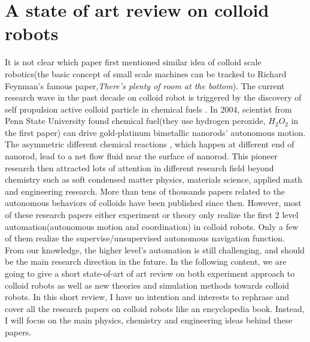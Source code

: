 \section{A state of art review on colloid robots }
It is not clear which paper first mentioned  similar idea of colloid scale robotics(the basic concept of  small scale machines can be tracked to Richard Feynman's famous paper,\textit{There's plenty of room at the bottom}\cite{feynman1960there}). The current research wave in the past decade on colloid robot is triggered by the discovery of self propulsion active colloid particle in chemical fuels \cite{paxton2004catalytic}. In 2004, scientist from Penn State University found chemical fuel(they use hydrogen peroxide, $H_2O_2$ in the first paper) can drive  gold-platinum bimetallic nanorods' autonomous motion. The asymmetric different chemical reactions , which happen at different end of nanorod,  lead to a net flow fluid near the surface of nanorod. This pioneer research then attracted lots of attention in different research field beyond chemistry such as soft condensed matter physics\cite{Marchetti2013}, materials science\cite{han2018engineering}, applied math\cite{fodor2016far} and engineering research\cite{sitti2015biomedical}. More than tens of thousands papers related to the autonomous behaviors of colloids have been published since then. However, most of these research papers either experiment or theory only realize the first 2 level automation(autonomous motion and coordination) in colloid robots. Only a few of them realize the supervise/unsupervised autonomous navigation function. From our knowledge, the higher level's automation is still challenging, and should be the main research direction in the future. In the following content, we are going to give a short state-of-art of art review on both experiment approach to colloid robots as well as new theories and simulation methods towards colloid robots. In this short review, I have no intention and interests to rephrase and cover all the research papers on colloid robots like an encyclopedia book. Instead,  I will focus on the main physics, chemistry and engineering ideas behind these papers. 
